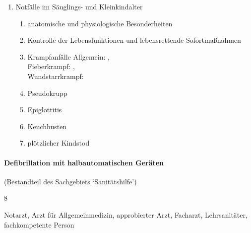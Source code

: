 \begin{enumerate}
    Schwangerschaft und Geburt
    \begin{enumerate}
      \item      Notfälle in der Schwangerschaft \dotfill  {},  
      \item      Geburt \dotfill      {}
      \item      Geburtskomplikationen \dotfill     {}
      \item      Versorgung des Neugeborenen \dotfill  {}
    \end{enumerate}
    \item Notfälle im Säuglings- und Kleinkindalter
    \begin{enumerate}
      \item      anatomische und physiologische Besonderheiten \dotfill     {}
      \item      Kontrolle der Lebensfunktionen und lebensrettende Sofortmaßnahmen \dotfill  {}
      \item      Krampfanfälle \dotfill Allgemein: ,
      \\       Fieberkrampf:  \dotfill {},
      \\      Wundstarrkrampf:  \dotfill {}
      \item      Pseudokrupp \dotfill  {}
      \item      Epiglottitis \dotfill  {}
      \item      Keuchhusten \dotfill  {}
      \item      plötzlicher Kindstod \dotfill    {}
    \end{enumerate}
  \end{enumerate}

\paragraph{Defibrillation mit halbautomatischen Geräten}
(Bestandteil des Sachgebiets  \enquote*{Sanitätshilfe})
  
  \begin{inparadesc}
    \item[Stundenanzahl:]   8
    \item[Lehrkraft:]   Notarzt,  Arzt für Allgemeinmedizin,  approbierter Arzt,
    Facharzt, Lehrsanitäter, fachkompetente Person
  \end{inparadesc}
  
